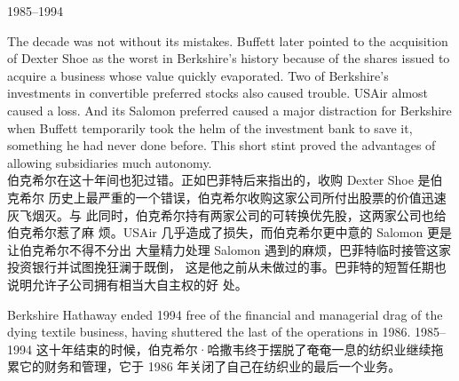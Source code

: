 \begin{section}{1985--1994}
\begin{verseparallel}
  {
    The decade was not without its mistakes. Buffett later pointed to the
    acquisition of Dexter Shoe as the worst in Berkshire's history because of
    the shares issued to acquire a business whose value quickly evaporated. Two
    of Berkshire's investments in convertible preferred stocks also caused
    trouble. USAir almost caused a loss. And its Salomon preferred caused a
    major distraction for Berkshire when Buffett temporarily took the helm of
    the investment bank to save it, something he had never done before. This
    short stint proved the advantages of allowing subsidiaries much autonomy. \\
  }
  {
    伯克希尔在这十年间也犯过错。正如巴菲特后来指出的，收购 Dexter Shoe 是伯克希尔
    历史上最严重的一个错误，伯克希尔收购这家公司所付出股票的价值迅速灰飞烟灭。与
    此同时，伯克希尔持有两家公司的可转换优先股，这两家公司也给伯克希尔惹了麻
    烦。USAir 几乎造成了损失，而伯克希尔更中意的 Salomon 更是让伯克希尔不得不分出
    大量精力处理 Salomon 遇到的麻烦，巴菲特临时接管这家投资银行并试图挽狂澜于既倒，
    这是他之前从未做过的事。巴菲特的短暂任期也说明允许子公司拥有相当大自主权的好
    处。
  }
\end{verseparallel}

\begin{verseparallel}
  {
    Berkshire Hathaway ended 1994 free of the financial and managerial drag of
    the dying textile business, having shuttered the last of the operations in
    1986.
  }
  {
    1985--1994 这十年结束的时候，伯克希尔·哈撒韦终于摆脱了奄奄一息的纺织业继续拖
    累它的财务和管理，它于 1986 年关闭了自己在纺织业的最后一个业务。
  }
\end{verseparallel}
\end{section}

